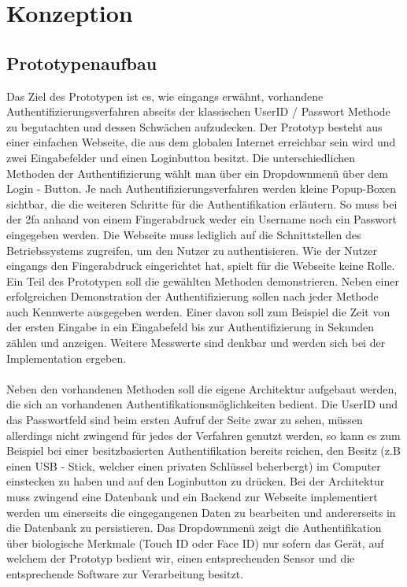 \chapter{Konzeption}
\section{Prototypenaufbau}
Das Ziel des Prototypen ist es, wie eingangs erwähnt, vorhandene Authentifizierungsverfahren abseits der klassischen UserID / Passwort Methode zu begutachten und dessen Schwächen aufzudecken. Der Prototyp besteht aus einer einfachen Webseite, die aus dem globalen Internet erreichbar sein wird und zwei Eingabefelder und einen Loginbutton besitzt. Die unterschiedlichen Methoden der Authentifizierung wählt man über ein Dropdownmenü über dem Login - Button. Je nach Authentifizierungsverfahren werden kleine Popup-Boxen sichtbar, die die weiteren Schritte für die Authentifikation erläutern. So muss bei der \ac{2fa} anhand von einem Fingerabdruck weder ein Username noch ein Passwort eingegeben werden. Die Webseite muss lediglich auf die Schnittstellen des Betriebssystems zugreifen, um den Nutzer zu authentisieren. Wie der Nutzer eingangs den Fingerabdruck eingerichtet hat, spielt für die Webseite keine Rolle.
Ein Teil des Prototypen soll die gewählten Methoden demonstrieren. Neben einer erfolgreichen Demonstration der Authentifizierung sollen nach jeder Methode auch Kennwerte ausgegeben werden. Einer davon soll zum Beispiel die Zeit von der ersten Eingabe in ein Eingabefeld bis zur Authentifizierung in Sekunden zählen und anzeigen. Weitere Messwerte sind denkbar und werden sich bei der Implementation ergeben. \\
\\
Neben den vorhandenen Methoden soll die eigene Architektur aufgebaut werden, die sich an vorhandenen Authentifikationsmöglichkeiten bedient. Die UserID und das Passwortfeld sind beim ersten Aufruf der Seite zwar zu sehen, müssen allerdings nicht zwingend für jedes der Verfahren genutzt werden, so kann es zum Beispiel bei einer besitzbasierten Authentifikation bereits reichen, den Besitz (z.B einen USB - Stick, welcher einen privaten Schlüssel beherbergt) im Computer einstecken zu haben und auf den Loginbutton zu drücken. Bei der Architektur muss zwingend eine Datenbank und ein Backend zur Webseite implementiert werden um einerseits die eingegangenen Daten zu bearbeiten und andererseits in die Datenbank zu persistieren. Das Dropdownmenü zeigt die Authentifikation über biologische Merkmale (Touch ID oder Face ID) nur sofern das Gerät, auf welchem der Prototyp bedient wir, einen entsprechenden Sensor und die entsprechende Software zur Verarbeitung besitzt.

